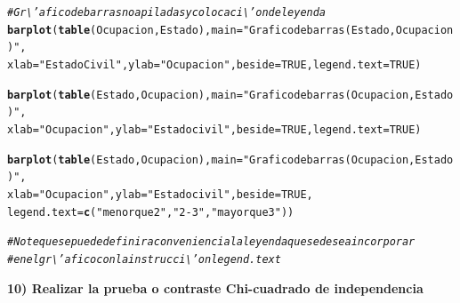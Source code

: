 \documentclass[12pt,letterpaper]{article}\usepackage[]{graphicx}\usepackage[]{color}
\makeatletter
\newcommand{\hlnum}[1]{\textcolor[rgb]{0.686,0.059,0.569}{#1}}%
\newcommand{\hlstr}[1]{\textcolor[rgb]{0.192,0.494,0.8}{#1}}%
\newcommand{\hlcom}[1]{\textcolor[rgb]{0.678,0.584,0.686}{\textit{#1}}}%
\newcommand{\hlstd}[1]{\textcolor[rgb]{0.345,0.345,0.345}{#1}}%
\newcommand{\hlkwc}[1]{\textcolor[rgb]{0.333,0.667,0.333}{#1}}%
\newcommand{\hlkwd}[1]{\textcolor[rgb]{0.737,0.353,0.396}{\textbf{#1}}}%
\newenvironment{kframe}{%
 \def\at@end@of@kframe{}%
 \ifinner\ifhmode%
  \def\at@end@of@kframe{\end{minipage}}%
  \begin{minipage}{\columnwidth}%
 \fi\fi%
 \def\FrameCommand##1{\hskip\@totalleftmargin \hskip-\fboxsep
 \colorbox{shadecolor}{##1}\hskip-\fboxsep
     \hskip-\linewidth \hskip-\@totalleftmargin \hskip\columnwidth}%
 \MakeFramed {\advance\hsize-\width
   \@totalleftmargin\z@ \linewidth\hsize
   \@setminipage}}%
 {\par\unskip\endMakeFramed%
 \at@end@of@kframe}
\newenvironment{knitrout}{}{} %
\makeatother
\begin{document}
\begin{knitrout}
\color{fgcolor}\begin{kframe}
\begin{alltt}
\hlcom{# Gr\textbackslash{}'afico de barras no apiladas y colocaci\textbackslash{}'on de leyenda}
\hlkwd{barplot}\hlstd{(}\hlkwd{table}\hlstd{(Ocupacion, Estado),} \hlkwc{main}\hlstd{=}\hlstr{"Grafico de barras (Estado, Ocupacion)"}\hlstd{,}
        \hlkwc{xlab} \hlstd{=}\hlstr{"Estado Civil"}\hlstd{,} \hlkwc{ylab}\hlstd{=}\hlstr{"Ocupacion"}\hlstd{,} \hlkwc{beside}\hlstd{=}\hlnum{TRUE}\hlstd{,} \hlkwc{legend.text}\hlstd{=}\hlnum{TRUE}\hlstd{)}
\end{alltt}


{\ttfamily\noindent\bfseries\color{errorcolor}{\#\# Error in table(Ocupacion, Estado): objeto 'Ocupacion' no encontrado}}\begin{alltt}
\hlkwd{barplot}\hlstd{(}\hlkwd{table}\hlstd{(Estado, Ocupacion),} \hlkwc{main}\hlstd{=}\hlstr{"Grafico de barras (Ocupacion, Estado)"}\hlstd{,}
        \hlkwc{xlab}\hlstd{=}\hlstr{"Ocupacion"}\hlstd{,} \hlkwc{ylab}\hlstd{=}\hlstr{"Estado civil"}\hlstd{,} \hlkwc{beside}\hlstd{=}\hlnum{TRUE}\hlstd{,} \hlkwc{legend.text}\hlstd{=}\hlnum{TRUE}\hlstd{)}
\end{alltt}


{\ttfamily\noindent\bfseries\color{errorcolor}{\#\# Error in table(Estado, Ocupacion): objeto 'Estado' no encontrado}}\begin{alltt}
\hlkwd{barplot}\hlstd{(}\hlkwd{table}\hlstd{(Estado, Ocupacion),} \hlkwc{main}\hlstd{=}\hlstr{"Grafico de barras (Ocupacion, Estado)"}\hlstd{,}
\hlkwc{xlab}\hlstd{=}\hlstr{"Ocupacion"}\hlstd{,} \hlkwc{ylab}\hlstd{=}\hlstr{"Estado civil"}\hlstd{,} \hlkwc{beside}\hlstd{=}\hlnum{TRUE}\hlstd{,}
\hlkwc{legend.text}\hlstd{=}\hlkwd{c}\hlstd{(}\hlstr{"menor que 2"}\hlstd{,} \hlstr{"2-3"}\hlstd{,}\hlstr{"mayor que 3"}\hlstd{))}
\end{alltt}


{\ttfamily\noindent\bfseries\color{errorcolor}{\#\# Error in table(Estado, Ocupacion): objeto 'Estado' no encontrado}}\begin{alltt}
\hlcom{# Note que se puede definir a conveniencia la leyenda que se desea incorporar }
\hlcom{# en el gr\textbackslash{}'afico con la instrucci\textbackslash{}'on legend.text}
\end{alltt}
\end{kframe}
\end{knitrout}
\textbf{10) Realizar la prueba o contraste Chi-cuadrado de independencia} 
\end{document}

